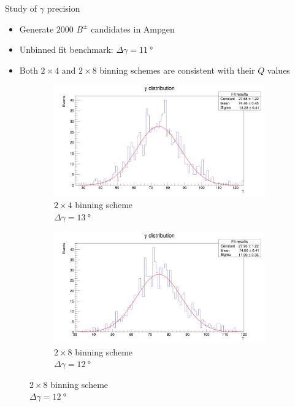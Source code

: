 \documentclass{beamer}
\begin{document}
\begin{frame}{Study of $\gamma$ precision}
  \begin{itemize}
    \item{Generate $2000$ $B^\pm$ candidates in Ampgen}
    \item{Unbinned fit benchmark: $\Delta\gamma = \SI{11}{\degree}$}
    \item{Both $2\times 4$ and $2\times 8$ binning schemes are consistent with their $Q$ values}
  \end{itemize}
  \begin{figure}
    \centering
    \vspace{-0.2cm}
    \begin{subfigure}{0.5\textwidth}
      \includegraphics[width = 1.0\textwidth]{Plots/GammaDistribution4BinsVariableWidth.png}
      \caption{$2\times 4$ binning scheme \\ $\Delta\gamma = \SI{13}{\degree}$}
    \end{subfigure}%
    \begin{subfigure}{0.5\textwidth}
      \includegraphics[width = 1.0\textwidth]{Plots/GammaDistribution8BinsVariableWidth.png}
      \caption{$2\times 8$ binning scheme \\ $\Delta\gamma = \SI{12}{\degree}$}
    \end{subfigure}
  \end{figure}
\end{frame}
\end{document}

